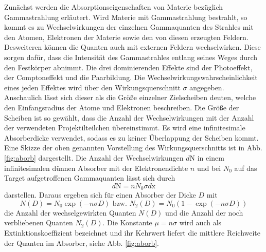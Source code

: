 Zunächst werden die Absorptionseigenschaften von Materie bezüglich Gammastrahlung erläutert.
Wird Materie mit Gammastrahlung bestrahlt, so kommt es zu Wechselwirkungen der einzelnen Gammaquanten des Strahles mit den Atomen, Elektronen der Materie sowie den von diesen erzeugten Feldern. Desweiteren können die Quanten auch mit externen Feldern wechselwirken.%
 Diese sorgen dafür, dass die Intensität des Gammastrahles entlang seines Weges durch den Festkörper abnimmt. Die drei dominierenden Effekte sind der Photoeffekt, der Comptoneffekt und die Paarbildung.
Die Wechselwirkungswahrscheinlichkeit eines jeden Effektes wird über den Wirkungsquerschnitt $\sigma$ angegeben.
 Anschaulich lässt sich dieser als die Größe einzelner Zielscheiben deuten, welche den Einfangsradius der Atome und Elektronen beschreiben. Die Größe der Scheiben ist so gewählt, dass die Anzahl der Wechselwirkungen mit der Anzahl der verwendeten Projektilteilchen  übereinstimmt. Es wird eine infinitesimale Absorberdicke verwendet, sodass es zu keiner Überlappung der Scheiben kommt. Eine Skizze der oben genannten Vorstellung des Wirkungsquerschnitts ist in Abb. \ref{fig:aborb} dargestellt.
Die Anzahl der Wechselwirkungen $d\text{N}$ in einem infinitesimalen dünnen Absorber mit der Elektronendichte $n$ und bei $N_0$ auf das Target aufgetroffenen Gammaquanten lässt sich durch
\begin{equation}
    d\text{N} = n N_0 \sigma d\text{x}
\end{equation}
darstellen. Daraus ergeben sich für einen Absorber der Dicke $D$ mit
\begin{equation}
N(D) = N_0 \exp(-n \sigma D) \text{  bzw.  }  N_2(D) = N_0 (1 - \exp(-n \sigma D)) \label{eq:Nd}
\end{equation}
die Anzahl der wechselgewirkten Quanten $N(D)$ und die Anzahl der noch verbliebenen Quanten $N_2(D)$. Die Konstante $ \mu = n \sigma$ wird auch als Extinktionskoeffizient bezeichnet und ihr Kehrwert liefert die mittlere Reichweite der Quanten im Absorber, siehe Abb. \ref{fig:aborb}.

